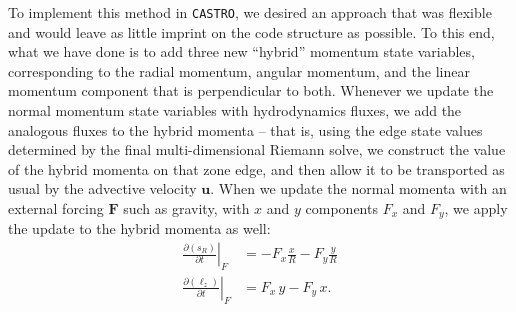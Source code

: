 \documentclass[twocolumn,numberedappendix]{../aastex6}
\newcommand{\castro}{\texttt{CASTRO}}
\begin{document}
To implement this method in \castro, we desired an approach that was flexible
and would leave as little imprint on the code structure as possible.
To this end, what we have done is to add three new ``hybrid'' momentum state
variables, corresponding to the radial momentum, angular momentum, and the linear
momentum component that is perpendicular to both. Whenever we update the normal
momentum state variables with hydrodynamics fluxes, we add the analogous fluxes
to the hybrid momenta -- that is, using the edge state values determined by the
final multi-dimensional Riemann solve, we construct the value of the hybrid
momenta on that zone edge, and then allow it to be transported as usual by the
advective velocity $\mathbf{u}$. When we update the normal momenta with an
external forcing $\mathbf{F}$ such as gravity, with $x$ and $y$
components $F_x$ and $F_y$, we apply the update to the hybrid momenta as well:
\begin{align}
  \left.\frac{\partial(s_R)}{\partial t}\right|_{F} &= -F_x \frac{x}{R} - F_y\frac{y}{R} \label{eq:force-radial}\\
  \left.\frac{\partial(\ell_z)}{\partial t}\right|_{F} &= F_x\, y - F_y\, x.\label{eq:force-angular}
  \end{align}
\end{document}
